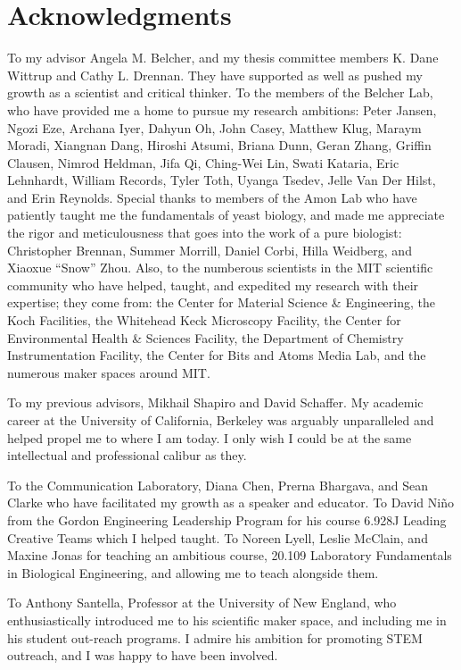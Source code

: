 \section*{Acknowledgments}

To my advisor Angela M. Belcher, and my thesis committee members K. Dane Wittrup and Cathy L. Drennan. They have supported as well as pushed my growth as a scientist and critical thinker. To the members of the Belcher Lab, who have provided me a home to pursue my research ambitions: Peter Jansen, Ngozi Eze, Archana Iyer, Dahyun Oh, John Casey, Matthew Klug, Maraym Moradi, Xiangnan Dang, Hiroshi Atsumi, Briana Dunn, Geran Zhang, Griffin Clausen, Nimrod Heldman, Jifa Qi, Ching-Wei Lin, Swati Kataria, Eric Lehnhardt, William Records, Tyler Toth, Uyanga Tsedev, Jelle Van Der Hilst, and Erin Reynolds. Special thanks to members of the Amon Lab who have patiently taught me the fundamentals of yeast biology, and made me appreciate the rigor and meticulousness that goes into the work of a pure biologist: Christopher Brennan, Summer Morrill, Daniel Corbi, Hilla Weidberg, and Xiaoxue ``Snow'' Zhou. Also, to the numberous scientists in the MIT scientific community who have helped, taught, and expedited my research with their expertise; they come from: the Center for Material Science \& Engineering, the Koch Facilities, the Whitehead Keck Microscopy Facility, the Center for Environmental Health \& Sciences Facility, the Department of Chemistry Instrumentation Facility, the Center for Bits and Atoms Media Lab, and the numerous maker spaces around MIT.

To my previous advisors, Mikhail Shapiro and David Schaffer. My academic career at the University of California, Berkeley was arguably unparalleled and helped propel me to where I am today. I only wish I could be at the same intellectual and professional calibur as they.

To the Communication Laboratory, Diana Chen, Prerna Bhargava, and Sean Clarke who have facilitated my growth as a speaker and educator. To David Ni\~no from the Gordon Engineering Leadership Program for his course 6.928J Leading Creative Teams which I helped taught. To Noreen Lyell, Leslie McClain, and Maxine Jonas for teaching an ambitious course, 20.109 Laboratory Fundamentals in Biological Engineering, and allowing me to teach alongside them.

To Anthony Santella, Professor at the University of New England, who enthusiastically introduced me to his scientific maker space, and including me in his student out-reach programs. I admire his ambition for promoting STEM outreach, and I was happy to have been involved.

